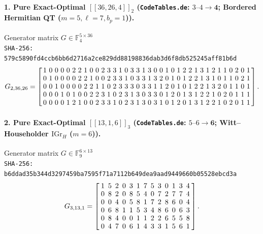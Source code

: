 \documentclass[11pt,a4paper]{article}
\theoremstyle{remark}
\begin{document}
\paragraph{1. Pure Exact-Optimal $[[36,26,4]]_{2}$ (\texttt{CodeTables.de}: $3\text{--}4 \to \mathbf{4}$; Bordered Hermitian QT ($m=5, \ell=7, b_p=1$)).} Generator matrix $G \in \mathbb{F}_{4}^{5 \times 36}$\\
{\footnotesize\texttt{SHA-256: 579c5890fd4ccb6bb6d2716a2ce829dd88198836dab3d6f8db525245aff81b6d}}
{\scriptsize\[
G_{2,36,26} = \setlength{\arraycolsep}{1.65pt}\renewcommand{\arraystretch}{0.95}
\left[\begin{array}{*{36}{r}}
1 & 0 & 0 & 0 & 0 & 2 & 2 & 1 & 0 & 0 & 2 & 3 & 3 & 1 & 0 & 3 & 3 & 1 & 3 & 0 & 0 & 1 & 0 & 1 & 2 & 2 & 1 & 3 & 1 & 2 & 1 & 1 & 0 & 2 & 0 & 1 \\
0 & 1 & 0 & 0 & 0 & 0 & 2 & 2 & 1 & 0 & 0 & 2 & 3 & 3 & 1 & 0 & 3 & 3 & 1 & 3 & 2 & 0 & 1 & 0 & 1 & 2 & 2 & 1 & 3 & 1 & 0 & 1 & 1 & 0 & 2 & 1 \\
0 & 0 & 1 & 0 & 0 & 0 & 0 & 2 & 2 & 1 & 1 & 0 & 2 & 3 & 3 & 3 & 0 & 3 & 3 & 1 & 1 & 2 & 0 & 1 & 0 & 1 & 2 & 2 & 1 & 3 & 2 & 0 & 1 & 1 & 0 & 1 \\
0 & 0 & 0 & 1 & 0 & 1 & 0 & 0 & 2 & 2 & 3 & 1 & 0 & 2 & 3 & 1 & 3 & 0 & 3 & 3 & 0 & 1 & 2 & 0 & 1 & 3 & 1 & 2 & 2 & 1 & 0 & 2 & 0 & 1 & 1 & 1 \\
0 & 0 & 0 & 0 & 1 & 2 & 1 & 0 & 0 & 2 & 3 & 3 & 1 & 0 & 2 & 3 & 1 & 3 & 0 & 3 & 1 & 0 & 1 & 2 & 0 & 1 & 3 & 1 & 2 & 2 & 1 & 0 & 2 & 0 & 1 & 1
\end{array}\right].
\]}

\paragraph{2. Pure Exact-Optimal $[[13,1,6]]_{3}$ (\texttt{CodeTables.de}: $5\text{--}6 \to \mathbf{6}$; Witt--Householder $\mathrm{IGr}_H$ ($m=6$)).} Generator matrix $G \in \mathbb{F}_{9}^{6 \times 13}$\\
{\footnotesize\texttt{SHA-256: b6ddad35b344d3297459ba7595f71a7112b649dea9aad9449660b05528ebcd3a}}
{\scriptsize\[
G_{3,13,1} = \setlength{\arraycolsep}{2.5pt}\renewcommand{\arraystretch}{0.95}
\left[\begin{array}{*{13}{r}}
1 & 5 & 2 & 0 & 3 & 1 & 7 & 5 & 3 & 0 & 1 & 3 & 4 \\
0 & 8 & 2 & 0 & 8 & 5 & 4 & 0 & 7 & 2 & 7 & 7 & 4 \\
0 & 0 & 4 & 0 & 5 & 8 & 1 & 7 & 2 & 8 & 6 & 0 & 4 \\
0 & 6 & 8 & 1 & 1 & 5 & 3 & 4 & 8 & 6 & 0 & 6 & 3 \\
0 & 8 & 4 & 0 & 0 & 1 & 1 & 2 & 2 & 6 & 5 & 5 & 8 \\
0 & 4 & 7 & 0 & 6 & 1 & 4 & 3 & 3 & 1 & 5 & 6 & 1
\end{array}\right].
\]}
\end{document}
